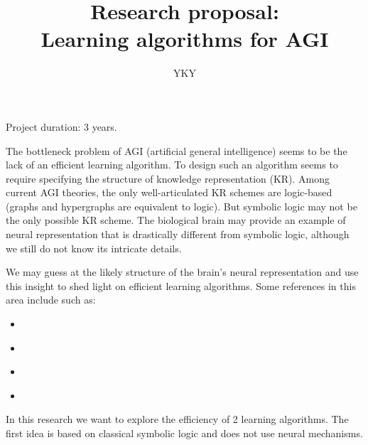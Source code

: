 

\usepackage{xeCJK}
\usepackage{color}
\usepackage{hyperref}
\usepackage{mathtools}



\title{{\small Research proposal:} \\ Learning algorithms for AGI}
\author{YKY}


\maketitle

Project duration: 3 years.

The bottleneck problem of AGI (artificial general intelligence) \parencite{Goertzel2007} seems to be the lack of an efficient learning algorithm.  To design such an algorithm seems to require specifying the structure of knowledge representation (KR).  Among current AGI theories, the only well-articulated KR schemes are logic-based (graphs and hypergraphs are equivalent to logic).  But symbolic logic may not be the only possible KR scheme.  The biological brain may provide an example of neural representation that is drastically different from symbolic logic, although we still do not know its intricate details.

We may guess at the likely structure of the brain's neural representation and use this insight to shed light on efficient learning algorithms.  Some references in this area include such as:
\begin{itemize}
	\item \cite{Garcez2009} 
	\item \cite{Omlin2000} 
	\item \cite{Go}
	\item \cite{Smolensky2006}
\end{itemize}

In this research we want to explore the efficiency of 2 learning algorithms.  The first idea is based on classical symbolic logic and does not use neural mechanisms.

